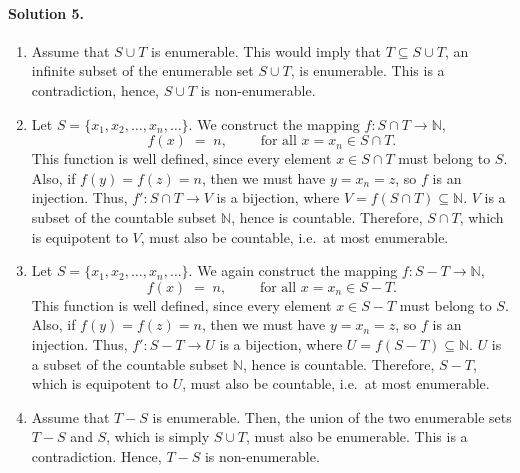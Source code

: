 \documentclass[10pt]{article}
\begin{document}
        \paragraph{Solution 5.}
        \begin{enumerate}
                \item Assume that $S \cup T$ is enumerable. This would imply that $T \subseteq S \cup T$, an infinite subset
                of the enumerable set $S\cup T$, is enumerable. This is a contradiction, hence, $S\cup T$ is non-enumerable.

                \item Let $S = \{x_1, x_2, \dots , x_n, \dots\}$. We construct the mapping $f \colon S \cap T \to \mathbb{N}$,
                \[
                f(x) \;=\; n, \quad\quad\text{ for all } x = x_n \in S \cap T.
                \]
                This function is well defined, since every element $x \in S\cap T$ must belong to $S$. Also, 
                if $f(y) = f(z) = n$, then we must have $y = x_n = z$, so $f$ is an injection. Thus,
                $f'\colon S\cap T\to V$ is a bijection, where $V = f(S\cap T) \subseteq \mathbb{N}$.
                $V$ is a subset of the countable subset $\mathbb{N}$, hence is countable. Therefore, $S\cap T$, which is equipotent to $V$,
                must also be countable, i.e.\ at most enumerable.

                \item Let $S = \{x_1, x_2, \dots, x_n, \dots\}$. We again construct the mapping $f\colon S - T \to \mathbb{N}$,
                \[
                f(x) \;=\; n, \quad\quad\text{ for all } x = x_n \in S - T.
                \]
                This function is well defined, since every element $x \in S - T$ must belong to $S$. Also, 
                if $f(y) = f(z) = n$, then we must have $y = x_n = z$, so $f$ is an injection. Thus,
                $f'\colon S - T \to U$ is a bijection, where $U = f(S - T) \subseteq \mathbb{N}$.
                $U$ is a subset of the countable subset $\mathbb{N}$, hence is countable. Therefore, $S - T$, which is equipotent to $U$,
                must also be countable, i.e.\ at most enumerable.

                \item Assume that $T - S$ is enumerable. Then, the union of the two enumerable sets $T - S$ and $S$, which is
                simply $S \cup T$, must also be enumerable. This is a contradiction. Hence, $T - S$ is non-enumerable.
        \end{enumerate}
\end{document}
